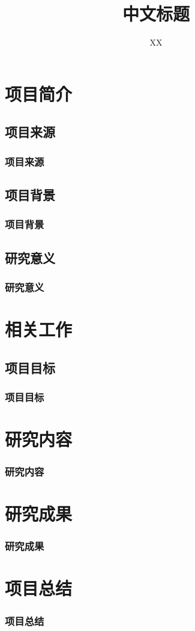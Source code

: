 \documentclass[aspectratio=169,12pt]{beamer}
\title{中文标题}
\author{XX}
\begin{document}
\maketitle
\makecontent

\section{项目简介}

\subsection{项目来源}
\begin{frame}
	\frametitle{项目来源}
\end{frame}

\subsection{项目背景}
\begin{frame}
	\frametitle{项目背景}
\end{frame}

\subsection{研究意义}
\begin{frame}
	\frametitle{研究意义}
\end{frame}

\section{相关工作}
\subsection{项目目标}
\begin{frame}
	\frametitle{项目目标}
\end{frame}

\section{研究内容}
\begin{frame}
	\frametitle{研究内容}
\end{frame}

\section{研究成果}
\begin{frame}
	\frametitle{研究成果}
\end{frame}

\section{项目总结}
\begin{frame}
	\frametitle{项目总结}
\end{frame}

\makebackcover
\end{document}
